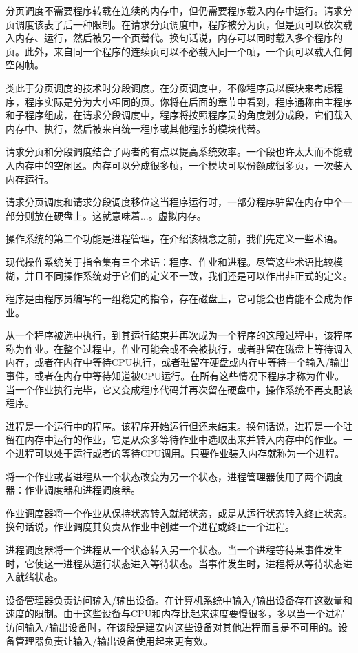 分页调度不需要程序转载在连续的内存中，但仍需要程序载入内存中运行。请求分页调度该表了后一种限制。在请求分页调度中，程序被分为页，但是页可以依次载入内存、运行，然后被另一个页替代。换句话说，内存可以同时载入多个程序的页。此外，来自同一个程序的连续页可以不必载入同一个帧，一个页可以载入任何空闲帧。

类此于分页调度的技术时分段调度。在分页调度中，不像程序员以模块来考虑程序，程序实际是分为大小相同的页。你将在后面的章节中看到，程序通称由主程序和子程序组成，在请求分段调度中，程序将按照程序员的角度划分成段，它们载入内存中、执行，然后被来自统一程序或其他程序的模块代替。

请求分页和分段调度结合了两者的有点以提高系统效率。一个段也许太大而不能载入内存中的空闲区。内存可以分成很多帧，一个模块可以份额成很多页，一次装入内存运行。

请求分页调度和请求分段调度移位这当程序运行时，一部分程序驻留在内存中个一部分则放在硬盘上。这就意味着...。虚拟内存。

操作系统的第二个功能是进程管理，在介绍该概念之前，我们先定义一些术语。

现代操作系统关于指令集有三个术语：程序、作业和进程。尽管这些术语比较模糊，并且不同操作系统对于它们的定义不一致，我们还是可以作出非正式的定义。

程序是由程序员编写的一组稳定的指令，存在磁盘上，它可能会也肯能不会成为作业。

从一个程序被选中执行，到其运行结束并再次成为一个程序的这段过程中，该程序称为作业。在整个过程中，作业可能会或不会被执行，或者驻留在磁盘上等待调入内存，或者在内存中等待CPU执行，或者驻留在硬盘或内存中等待一个输入/输出事件，或者在内存中等待知道被CPU运行。在所有这些情况下程序才称为作业。当一个作业执行完毕，它又变成程序代码并再次留在硬盘中，操作系统不再支配该程序。

进程是一个运行中的程序。该程序开始运行但还未结束。换句话说，进程是一个驻留在内存中运行的作业，它是从众多等待作业中选取出来并转入内存中的作业。一个进程可以处于运行或者的等待CPU调用。只要作业装入内存就称为一个进程。

将一个作业或者进程从一个状态改变为另一个状态，进程管理器使用了两个调度器：作业调度器和进程调度器。

作业调度器将一个作业从保持状态转入就绪状态，或是从运行状态转入终止状态。换句话说，作业调度其负责从作业中创建一个进程或终止一个进程。

进程调度器将一个进程从一个状态转入另一个状态。当一个进程等待某事件发生时，它使这一进程从运行状态进入等待状态。当事件发生时，进程将从等待状态进入就绪状态。

设备管理器负责访问输入/输出设备。在计算机系统中输入/输出设备存在这数量和速度的限制。由于这些设备与CPU和内存比起来速度要慢很多，多以当一个进程访问输入/输出设备时，在该段是建安内这些设备对其他进程而言是不可用的。设备管理器负责让输入/输出设备使用起来更有效。

